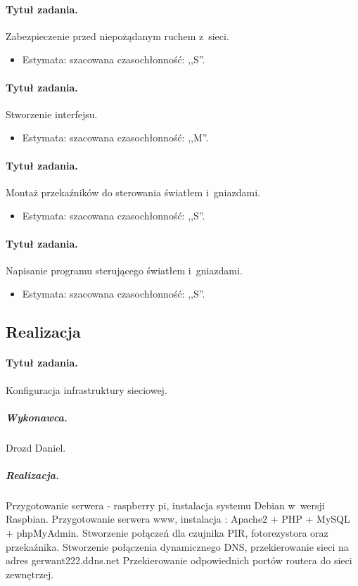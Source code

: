 	\paragraph{Tytuł zadania.} Zabezpieczenie przed niepożądanym ruchem z~sieci.
	\begin{itemize}
		\item Estymata: szacowana czasochłonność: ,,S''.
	\end{itemize}
	
	\paragraph{Tytuł zadania.} Stworzenie interfejsu.
	\begin{itemize}
		\item Estymata: szacowana czasochłonność: ,,M''.
	\end{itemize}
	
	\paragraph{Tytuł zadania.} Montaż przekaźników do sterowania światłem i~gniazdami.
	\begin{itemize}
		\item Estymata: szacowana czasochłonność: ,,S''.
	\end{itemize}
	
	\paragraph{Tytuł zadania.} Napisanie programu sterującego światłem i~gniazdami.
	\begin{itemize}
		\item Estymata: szacowana czasochłonność: ,,S''.
	\end{itemize}


	\subsection{Realizacja}
	
	\paragraph{Tytuł zadania.} Konfiguracja infrastruktury sieciowej.
	\subparagraph{Wykonawca.} Drozd Daniel.
	\subparagraph{Realizacja.} Przygotowanie serwera - raspberry pi, instalacja systemu Debian w~wersji Raspbian. Przygotowanie serwera www, instalacja : Apache2 + PHP + MySQL + phpMyAdmin.
  Stworzenie połączeń dla czujnika PIR, fotorezystora oraz przekaźnika. Stworzenie połączenia dynamicznego DNS, przekierowanie sieci na adres gerwant222.ddns.net
  Przekierowanie odpowiednich portów routera do sieci zewnętrzej.
 	   	   
